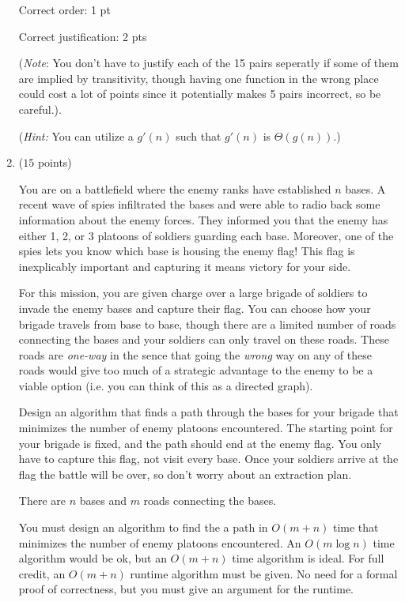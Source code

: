 \documentclass[11pt]{article}
\begin{document}
\begin{enumerate}
Correct order: 1 pt

Correct justification: 2 pts

(\textit{Note}: You don't have to justify each of the 15 pairs seperatly if some of them are implied by transitivity, though having one function in the wrong place could cost a lot of points since it potentially makes 5 pairs incorrect, so be careful.).




(\textit{Hint:} You can utilize a $g'(n)$ such that $g'(n)$ is $\Theta(g(n))$.)



\item ($15$ {\sf points}) 

You are on a battlefield where the enemy ranks have established $n$ bases. A recent wave of spies infiltrated the bases and were able to radio back some information about the enemy forces. They informed you that the enemy has either 1, 2, or 3 platoons of soldiers guarding each base. Moreover, one of the spies lets you know which base is housing the enemy flag! This flag is inexplicably important and capturing it means victory for your side.

For this mission, you are given charge over a large brigade of soldiers to invade the enemy bases and capture their flag. You can choose how your brigade travels from base to base, though there are a limited number of roads connecting the bases and your soldiers can only travel on these roads. These roads are {\em one-way} in the sence that going the {\em wrong} way on any of these roads would give too much of a strategic advantage to the enemy to be a viable option (i.e. you can think of this as a directed graph).

Design an algorithm that finds a path through the bases for your brigade that minimizes the number of enemy platoons encountered.  The starting point for your brigade is fixed, and the path should end at the enemy flag. You only have to capture this flag, not visit every base. Once your soldiers arrive at the flag the battle will be over, so don't worry about an extraction plan.

There are $n$ bases and $m$ roads connecting the bases.

You must design an algorithm to find the a path in $O(m +n)$ time that minimizes the number of enemy platoons encountered. An $O(m\log{n})$ time algorithm would be ok, but an $O(m +n)$ time algorithm is ideal. For full credit, an $O(m +n)$ runtime algorithm must be given. No need for a formal proof of correctness, but you must give an argument for the runtime.





\end{enumerate}
\end{document}
